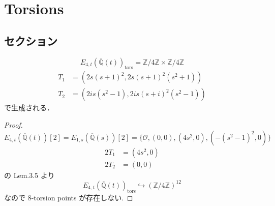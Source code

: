 \documentclass[main]{subfiles}
\begin{document}
\chapter{Torsions}

\section{セクション}

\begin{thm}
    \begin{equation}
        E_{4,t}(\overline{\mathbb{Q}}(t))_ \text{tors} = \mathbb{Z} / 4 \mathbb{Z} \times \mathbb{Z} / 4 \mathbb{Z}
    \end{equation}
    \begin{align}
        T_1 & = (2s(s+1)^2,2s(s+1)^2(s^2+1))   \\
        T_2 & = (2is(s^2-1),2is(s+i)^2(s^2-1))
    \end{align}
    で生成される．
\end{thm}
\begin{proof}
    \begin{equation}
        E_{4,t}(\overline{\mathbb{Q}}(t))[2] = E_{1,s}(\overline{\mathbb{Q}}(s))[2] = \{\mathcal{O}, (0,0), (4s^{2},0),( - (s^{2} - 1)^{2},0)\}
    \end{equation}
    \begin{align}
        2T_1 & = (4s^2,0) \\
        2T_2 & = (0,0)
    \end{align}
    \cite{ref:naskrecki2013} の Lem.3.5 より
    \begin{equation}
        E_{4,t}(\overline{\mathbb{Q}}(t))_ \text{tors} \hookrightarrow (\mathbb{Z} / 4 \mathbb{Z})^{12}
    \end{equation}
    なので 8-torsion points が存在しない.
\end{proof}
\end{document}
